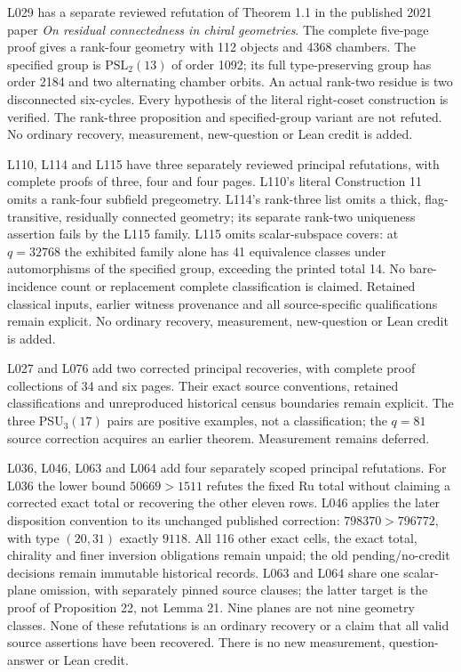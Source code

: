 \documentclass[11pt,a4paper]{article}
\begin{document}
L029 has a separate reviewed refutation of Theorem 1.1 in the published
2021 paper \emph{On residual connectedness in chiral geometries}. The
complete five-page proof gives a rank-four geometry with 112 objects and
4368 chambers. The specified group is $\mathrm{PSL}_2(13)$ of order 1092;
its full type-preserving group has order 2184 and two alternating chamber
orbits. An actual rank-two residue is two disconnected six-cycles. Every
hypothesis of the literal right-coset construction is verified. The
rank-three proposition and specified-group variant are not refuted. No
ordinary recovery, measurement, new-question or Lean credit is added.

L110, L114 and L115 have three separately reviewed principal refutations,
with complete proofs of three, four and four pages. L110's literal
Construction 11 omits a rank-four subfield pregeometry. L114's rank-three
list omits a thick, flag-transitive, residually connected geometry; its
separate rank-two uniqueness assertion fails by the L115 family. L115
omits scalar-subspace covers: at $q=32768$ the exhibited family alone has
41 equivalence classes under automorphisms of the specified group,
exceeding the printed total 14. No bare-incidence count or replacement
complete classification is claimed. Retained classical inputs, earlier
witness provenance and all source-specific qualifications remain explicit.
No ordinary recovery, measurement, new-question or Lean credit is added.

L027 and L076 add two corrected principal recoveries, with complete
proof collections of 34 and six pages. Their exact source conventions,
retained classifications and unreproduced historical census boundaries
remain explicit. The three PSU$_3(17)$ pairs are positive examples, not a
classification; the $q=81$ source correction acquires an earlier theorem.
Measurement remains deferred.

L036, L046, L063 and L064 add four separately scoped principal refutations.
For L036 the lower bound $50669>1511$ refutes the fixed Ru total without
claiming a corrected exact total or recovering the other eleven rows.
L046 applies the later disposition convention to its unchanged published
correction: $798370>796772$, with type $(20,31)$ exactly $9118$.
All 116 other exact cells, the exact total, chirality and finer inversion
obligations remain unpaid; the old pending/no-credit decisions remain
immutable historical records. L063 and L064 share one scalar-plane omission,
with separately pinned source clauses; the latter target is the proof of
Proposition 22, not Lemma 21. Nine planes are not nine geometry classes.
None of these refutations is an ordinary recovery or a claim that all valid
source assertions have been recovered. There is no new measurement,
question-answer or Lean credit.
\end{document}
